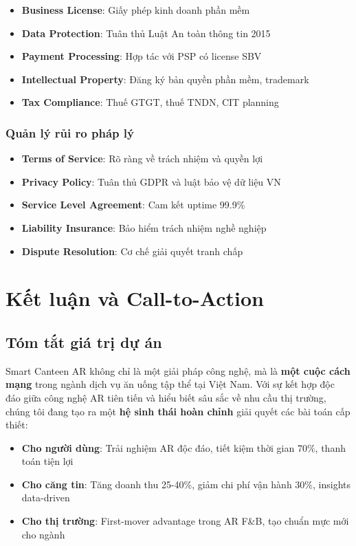 \documentclass[12pt,a4paper]{article}
\begin{document}
\begin{itemize}[leftmargin=1cm]
    \item \textbf{Business License}: Giấy phép kinh doanh phần mềm
    \item \textbf{Data Protection}: Tuân thủ Luật An toàn thông tin 2015
    \item \textbf{Payment Processing}: Hợp tác với PSP có license SBV
    \item \textbf{Intellectual Property}: Đăng ký bản quyền phần mềm, trademark
    \item \textbf{Tax Compliance}: Thuế GTGT, thuế TNDN, CIT planning
\end{itemize}

\subsubsection{Quản lý rủi ro pháp lý}

\begin{itemize}[leftmargin=1cm]
    \item \textbf{Terms of Service}: Rõ ràng về trách nhiệm và quyền lợi
    \item \textbf{Privacy Policy}: Tuân thủ GDPR và luật bảo vệ dữ liệu VN
    \item \textbf{Service Level Agreement}: Cam kết uptime 99.9\%
    \item \textbf{Liability Insurance}: Bảo hiểm trách nhiệm nghề nghiệp
    \item \textbf{Dispute Resolution}: Cơ chế giải quyết tranh chấp
\end{itemize}

\section{Kết luận và Call-to-Action}

\subsection{Tóm tắt giá trị dự án}

Smart Canteen AR không chỉ là một giải pháp công nghệ, mà là \textbf{một cuộc cách mạng} trong ngành dịch vụ ăn uống tập thể tại Việt Nam. Với sự kết hợp độc đáo giữa công nghệ AR tiên tiến và hiểu biết sâu sắc về nhu cầu thị trường, chúng tôi đang tạo ra một \textbf{hệ sinh thái hoàn chỉnh} giải quyết các bài toán cấp thiết:

\begin{tcolorbox}[colback=green!5!white,colframe=darkgreen,title=\textbf{Value Proposition Summary}]
\begin{itemize}[leftmargin=1cm]
    \item \textbf{Cho người dùng}: Trải nghiệm AR độc đáo, tiết kiệm thời gian 70\%, thanh toán tiện lợi
    \item \textbf{Cho căng tin}: Tăng doanh thu 25-40\%, giảm chi phí vận hành 30\%, insights data-driven
    \item \textbf{Cho thị trường}: First-mover advantage trong AR F\&B, tạo chuẩn mực mới cho ngành
\end{itemize}
\end{tcolorbox}
\end{document}
